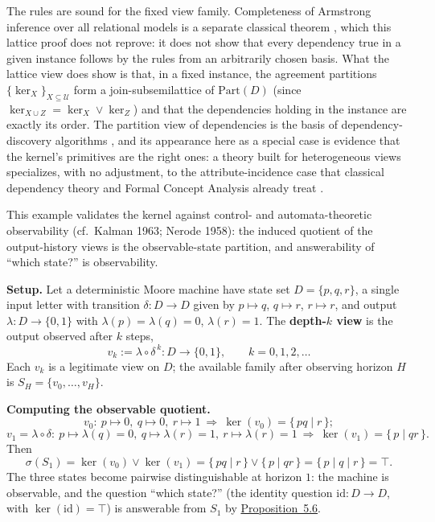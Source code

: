 The rules are sound for the fixed view family. Completeness of Armstrong inference over all relational models is a separate classical theorem \autocite{armstrong1974}, which this lattice proof does not reprove: it does not show that every dependency true in a given instance follows by the rules from an arbitrarily chosen basis. What the lattice view does show is that, in a fixed instance, the agreement partitions \(\{\ker_X\}_{X\subseteq\mathcal U}\) form a join-subsemilattice of \(\mathrm{Part}(D)\) (since \(\ker_{X\cup Z}=\ker_X\vee\ker_Z\)) and that the dependencies holding in the instance are exactly its order. The partition view of dependencies is the basis of dependency-discovery algorithms \autocite{huhtala1999}, and its appearance here as a special case is evidence that the kernel's primitives are the right ones: a theory built for heterogeneous views specializes, with no adjustment, to the attribute-incidence case that classical dependency theory and Formal Concept Analysis already treat \autocite{armstrong1974,ganter1999}.


This example validates the kernel against control- and automata-theoretic observability (cf.~Kalman 1963; Nerode 1958): the induced quotient of the output-history views is the observable-state partition, and answerability of ``which state?'' is observability.

\textbf{Setup.} Let a deterministic Moore machine have state set \(D=\{p,q,r\}\), a single input letter with transition \(\delta:D\to D\) given by \(p\mapsto q\), \(q\mapsto r\), \(r\mapsto r\), and output \(\lambda:D\to\{0,1\}\) with \(\lambda(p)=\lambda(q)=0\), \(\lambda(r)=1\). The \textbf{depth-\(k\) view} is the output observed after \(k\) steps,
\[
v_k:=\lambda\circ\delta^{\,k}:D\to\{0,1\},\qquad k=0,1,2,\dots
\]
Each \(v_k\) is a legitimate view on \(D\); the available family after observing horizon \(H\) is \(S_H=\{v_0,\dots,v_H\}\).

\textbf{Computing the observable quotient.}
\[
v_0:\ p\mapsto0,\ q\mapsto0,\ r\mapsto1
\ \Rightarrow\ \ker(v_0)=\{\,pq\mid r\,\};
\]
\[
v_1=\lambda\circ\delta:\ p\mapsto\lambda(q)=0,\ q\mapsto\lambda(r)=1,\ r\mapsto\lambda(r)=1
\ \Rightarrow\ \ker(v_1)=\{\,p\mid qr\,\}.
\]
Then
\[
\sigma(S_1)=\ker(v_0)\vee\ker(v_1)=\{\,pq\mid r\,\}\vee\{\,p\mid qr\,\}=\{\,p\mid q\mid r\,\}=\top .
\]
The three states become pairwise distinguishable at horizon \(1\): the machine is observable, and the question ``which state?'' (the identity question \(\mathrm{id}:D\to D\), with \(\ker(\mathrm{id})=\top\)) is answerable from \(S_1\) by \hyperlink{stmt:5.6}{Proposition~5.6}.

